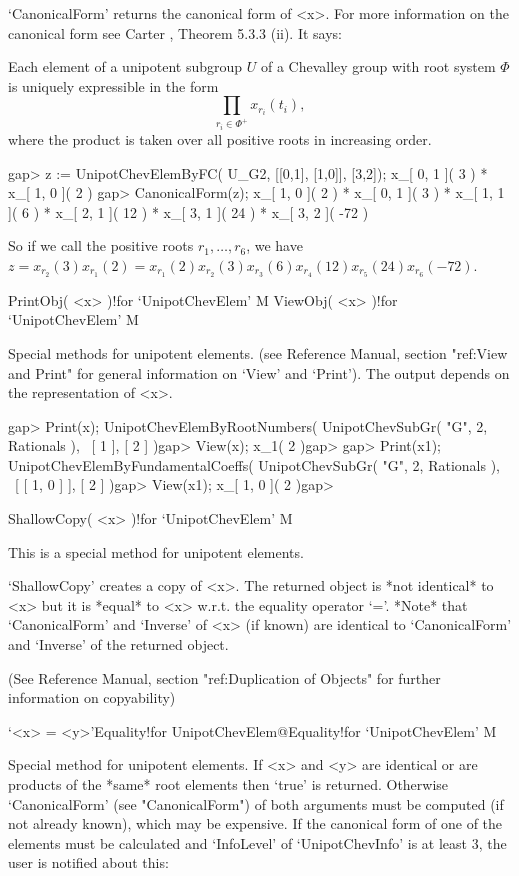 `CanonicalForm'  returns the  canonical form of <x>. For more information
on the canonical form  see Carter \cite{Carter72}, Theorem 5.3.3 (ii). It
says:

Each  element of  a unipotent subgroup $U$ of a Chevalley group with root
system $\Phi$ is uniquely expressible in the form
$$
\prod_{r_i\in\Phi^+} x_{r_i}(t_i),
$$
where the product is taken over all positive roots in increasing order.

\beginexample
gap> z := UnipotChevElemByFC( U_G2, [[0,1], [1,0]], [3,2]);
x_{[ 0, 1 ]}( 3 ) * x_{[ 1, 0 ]}( 2 )
gap> CanonicalForm(z);
x_{[ 1, 0 ]}( 2 ) * x_{[ 0, 1 ]}( 3 ) * x_{[ 1, 1 ]}( 6 ) *
x_{[ 2, 1 ]}( 12 ) * x_{[ 3, 1 ]}( 24 ) * x_{[ 3, 2 ]}( -72 )
\endexample

So  if  we  call  the  positive  roots  $r_1,\dots,r_6$,  we  have  $ z =
x_{r_2}(3)x_{r_1}(2) = x_{r_1}( 2 ) x_{r_2}( 3 ) x_{r_3}( 6 ) x_{r_4}( 12
) x_{r_5}( 24 ) x_{r_6}( -72 )$.


\>PrintObj( <x> )!{for `UnipotChevElem'} M
\>ViewObj( <x> )!{for `UnipotChevElem'} M

Special  methods for  unipotent elements. (see {\GAP}  Reference  Manual,
section  "ref:View  and  Print"  for  general  information on  `View' and
`Print'). The output depends on the representation of <x>.


\beginexample
gap> Print(x);
UnipotChevElemByRootNumbers( UnipotChevSubGr( "G", 2, Rationals ), \
[ 1 ], [ 2 ] )gap> View(x);
x_{1}( 2 )gap>
\endexample
\beginexample
gap> Print(x1);
UnipotChevElemByFundamentalCoeffs( UnipotChevSubGr( "G", 2, Rationals ), \
[ [ 1, 0 ] ], [ 2 ] )gap> View(x1);
x_{[ 1, 0 ]}( 2 )gap>
\endexample

\>ShallowCopy( <x> )!{for `UnipotChevElem'} M

This is a special method for unipotent elements.

`ShallowCopy'  creates  a  copy  of  <x>.  The  returned  object is  *not
identical* to <x> but it  is *equal* to <x> w.r.t. the  equality operator
`='. *Note* that `CanonicalForm' and  `Inverse'  of  <x>  (if known)  are
identical to `CanonicalForm' and `Inverse' of the returned object.

(See {\GAP} Reference  Manual,  section "ref:Duplication of Objects"  for
further information on copyability)

\>`<x> = <y>'{Equality!for UnipotChevElem}@{Equality!for `UnipotChevElem'} M
\indextt{\\=}

Special  method  for unipotent elements. If <x> and <y> are identical  or
are  products of  the  *same* root  elements  then  `true'  is  returned.
Otherwise `CanonicalForm' (see "CanonicalForm") of both arguments must be
computed (if not already known), which may be expensive. If the canonical
form of one  of  the  elements  must be  calculated  and  `InfoLevel'  of
`UnipotChevInfo' is at least 3, the user is notified about this:


